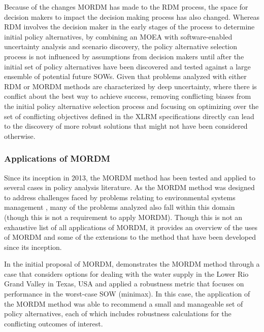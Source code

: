     Because of the changes MORDM has made to the RDM process, the space for decision makers to impact the decision making process has also changed. Whereas RDM involves the decision maker in the early stages of the process to determine initial policy alternatives, by combining an MOEA with software-enabled uncertainty analysis and scenario discovery, the policy alternative selection process is not influenced by assumptions from decision makers until after the initial set of policy alternatives have been discovered and tested against a large ensemble of potential future SOWs. Given that problems analyzed with either RDM or MORDM methods are characterized by deep uncertainty, where there is conflict about the best way to achieve success, removing conflicting biases from the initial policy alternative selection process and focusing on optimizing over the set of conflicting objectives defined in the XLRM specifications directly can lead to the discovery of more robust solutions that might not have been considered otherwise. 

        \subsubsection{Applications of MORDM}\label{review-mordm-apps}
        Since its inception in 2013, the MORDM method has been tested and applied to several cases in policy analysis literature. As the MORDM method was designed to address challenges faced by problems relating to environmental systems management \citep{Kasprzyk2013}, many of the problems analyzed also fall within this domain (though this is not a requirement to apply MORDM). Though this is not an exhaustive list of all applications of MORDM, it provides an overview of the uses of MORDM and some of the extensions to the method that have been developed since its inception.
        
        In the initial proposal of MORDM, \citet{Kasprzyk2013} demonstrates the MORDM method through a case that considers options for dealing with the water supply in the Lower Rio Grand Valley in Texas, USA and applied a robustness metric that focuses on performance in the worst-case SOW (minimax). In this case, the application of the MORDM method was able to recommend a small and manageable set of policy alternatives, each of which includes robustness calculations for the conflicting outcomes of interest. 
        
